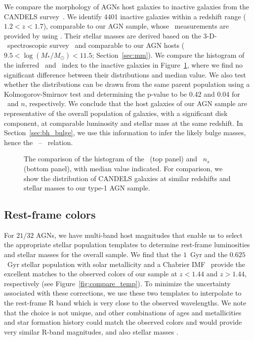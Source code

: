 \documentclass[apj]{emulateapj}
\begin{document}
We compare the morphology of AGNs host galaxies to inactive galaxies from the CANDELS survey~\citep{Grogin2011, Koekemoer2011}. We identify 4401 inactive galaxies within a redshift range ($1.2<z<1.7$), comparable to our AGN sample, whose \sersic\ measurements are provided by \citet{VDwel++2012} using \galfit. Their stellar masses are derived based on the 3-D-\hst\ spectroscopic survey~\citep{Momcheva2016, Brammer2012} and comparable to our AGN hosts ($9.5< \log (M_* /M_{\odot})< 11.5$; Section~\ref{sec:mm}). We compare the histogram of the inferred \Reff\ and \sersic\ index to the inactive galaxies in Figure~\ref{fig:hist_rn}, where we find no significant difference between their distributions and median value. We also test whether the distributions can be drawn from the same parent population using a Kolmogorov-Smirnov test and determining the p-value to be 0.42 and 0.04 for \Reff\ and $n$, respectively. We conclude that the host galaxies of our AGN sample are representative of the overall population of galaxies, with a significant disk component, at comparable luminosity and stellar mass at the same redshift. In Section~\ref{sec:bh_bulge}, we use this information to infer the likely bulge masses, hence the \mbh\ -- \bmass\ relation.



\begin{figure}[ht]
\caption{\label{fig:hist_rn} 
The comparison of the histogram of the \Reff\ (top panel) and \sersic\ $n_s$ (bottom panel), with median value indicated. For comparison, we show the distribution of CANDELS galaxies at similar redshifts and stellar masses to our type-1 AGN sample.}
\end{figure} 

\subsection{Rest-frame colors}

For $21/32$ AGNs, we have multi-band host magnitudes that enable us to select the appropriate stellar population templates to determine rest-frame luminosities and stellar masses for the overall sample.  We find that the $1$~Gyr and the $0.625$~Gyr stellar population with solar metallicity and a Chabrier IMF~\citep{Bruzual2003} provide the excellent matches to the observed colors of our sample at $z<1.44$ and $z>1.44$, respectively  (see Figure~\ref{fig:compare_temp}). To minimize the uncertainty associated with these corrections, we use these two templates to interpolate to the rest-frame R band which is very close to the observed wavelengths. We note that the choice is not unique, and other combinations of ages and metallicities and star formation history could match the observed colors and would provide very similar R-band magnitudes, and also stellar masses \citep{Bell2000, Bell2001}. 
\end{document}
